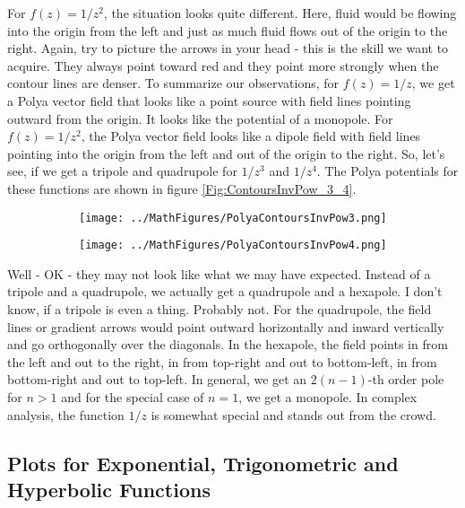 \documentclass[12pt]{article}
\begin{document}
\medskip
For $f(z) = 1/z^2$, the situation looks quite different. Here, fluid would be flowing into the origin from the left and just as much fluid flows out of the origin to the right. Again, try to picture the arrows in your head - this is the skill we want to acquire. They always point toward red and they point more strongly when the contour lines are denser. To summarize our observations, for $f(z) = 1/z$, we get a Polya vector field that looks like a point source with field lines pointing outward from the origin. It looks like the potential of a monopole. For $f(z) = 1/z^2$, the Polya vector field looks like a dipole field with field lines pointing into the origin from the left and out of the origin to the right. So, let's see, if we get a tripole and quadrupole for $1/z^3$ and $1/z^4$. The Polya potentials for these functions are shown in figure \ref{Fig:ContoursInvPow_3_4}.
\begin{figure}[h]
\caption{Polya potential contours of $f(z) = 1/z^3$ and $f(z) = 1/z^4$}	
\label{Fig:ContoursInvPow_3_4}	
\centering
\begin{subfigure}[b]{0.49\textwidth}
\centering
\texttt{[image: ../MathFigures/PolyaContoursInvPow3.png]}
\end{subfigure}
\begin{subfigure}[b]{0.49\textwidth}
\centering
\texttt{[image: ../MathFigures/PolyaContoursInvPow4.png]}
\end{subfigure}
\end{figure}

\medskip
Well - OK - they may not look like what we may have expected. Instead of a tripole and a quadrupole, we actually get a quadrupole and a hexapole. I don't know, if a tripole is even a thing. Probably not. For the quadrupole, the field lines or gradient arrows would point outward horizontally and inward vertically and go orthogonally over the diagonals. In the hexapole, the field points in from the left and out to the right, in from top-right and out to bottom-left, in from bottom-right and out to top-left. In general, we get an $2(n-1)$-th order pole for $n > 1$ and for the special case of $n = 1$, we get a monopole. In complex analysis, the function $1/z$ is somewhat special and stands out from the crowd.


\subsection{Plots for Exponential, Trigonometric and Hyperbolic Functions}
\end{document}
